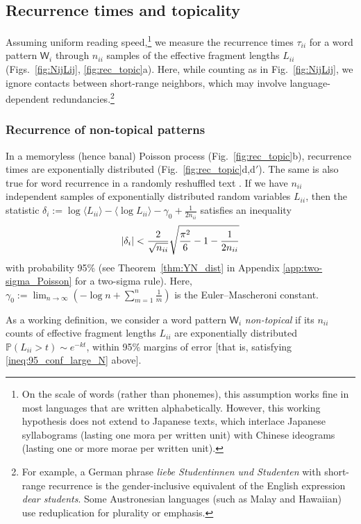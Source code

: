 \documentclass[10pt,journal,compsoc]{IEEEtran}
\begin{document}
\subsection{Recurrence times and topicality\label{subsec:rec_topic}}Assuming  uniform
reading speed,\footnote{On the scale of words (rather than phonemes), this assumption works fine in most  languages that are written alphabetically. However, this working hypothesis   does not extend to Japanese texts, which  interlace Japanese syllabograms (lasting one mora per written unit) with Chinese ideograms (lasting one or more morae per  written unit).} we measure   the  recurrence times  $ \tau_{ii}$ for a word pattern $ \mathsf W_i$ through   $ n_{ii}$ samples of the effective fragment lengths $ L_{ii}$ (Figs.~\ref{fig:NijLij}, \ref{fig:rec_topic}a).
Here, while counting as in Fig.~\ref{fig:NijLij},  we
ignore
contacts between short-range neighbors, which may involve language-dependent redundancies.\footnote{For example, a German phrase \textit{liebe Studentinnen und Studenten }with short-range recurrence is the gender-inclusive equivalent of the English expression \textit{dear students}. Some Austronesian languages (such as Malay and Hawaiian) use reduplication for  plurality or emphasis.}


\subsubsection{Recurrence of non-topical patterns}
 In a memoryless (hence banal) Poisson process (Fig.~\ref{fig:rec_topic}b), recurrence times are exponentially distributed (Fig.~\ref{fig:rec_topic}d,d$'$). The same is also true for word recurrence  in a randomly reshuffled text \cite{HerreraPury2008}. If  we have $n_{ii}$ independent samples of exponentially distributed random variables $L_{ii} $, then the statistic  $ \delta_{i}:=\log\langle L_{ii}\rangle-\langle\log L_{ii}\rangle- \gamma_0+\frac{1}{2n_{ii}}$ satisfies an inequality\begin{align}\left|\delta_{i} \right|<\frac{2}{\sqrt {\smash[b]{n_{ii}}}}\sqrt{\frac{\pi^2}{6}-1-\frac{1}{2n_{ii}}}\label{ineq:95_conf_large_N}\end{align}with probability 95\% (see Theorem~\ref{thm:YN_dist} in Appendix \ref{app:two-sigma_Poisson} for a two-sigma rule).  Here, $  \gamma_0:=\lim_{n\to\infty}\left(-\log n+\sum_{m=1}^n\frac1m\right)$ is the Euler--Mascheroni constant.

As a working definition, we consider a word pattern
$ \mathsf W_i$
\textit{non-topical} if  its $ n_{ii}$ counts  of  effective fragment lengths $ L_{ii}$ are exponentially distributed $ \mathbb P(L_{ii}>t)\sim e^{-kt}$, within  95\% margins of error [that is, satisfying \eqref{ineq:95_conf_large_N} above].
\end{document}
